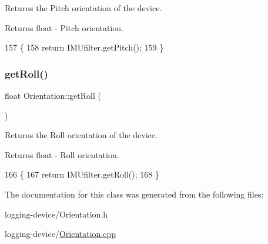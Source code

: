 Returns the Pitch orientation of the device. 

\begin{DoxyReturn}{Returns}
float -\/ Pitch orientation. 
\end{DoxyReturn}

\begin{DoxyCode}
157 \{
158   \textcolor{keywordflow}{return} IMUfilter.getPitch();
159 \}
\end{DoxyCode}
\mbox{\label{class_orientation_ab8923432cb8c18822b0a9ae95a5ac505}} 
\subsubsection{\texorpdfstring{get\+Roll()}{getRoll()}}
{\footnotesize\ttfamily float Orientation\+::get\+Roll (\begin{DoxyParamCaption}{ }\end{DoxyParamCaption})}



Returns the Roll orientation of the device. 

\begin{DoxyReturn}{Returns}
float -\/ Roll orientation. 
\end{DoxyReturn}

\begin{DoxyCode}
166 \{
167   \textcolor{keywordflow}{return} IMUfilter.getRoll();
168 \}
\end{DoxyCode}


The documentation for this class was generated from the following files\+:\begin{DoxyCompactItemize}
\item 
logging-\/device/Orientation.\+h\item 
logging-\/device/\hyperlink{_orientation_8cpp}{Orientation.\+cpp}\end{DoxyCompactItemize}

